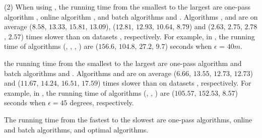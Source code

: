 \sstab (2) When using \sed, the running time from the smallest to the largest are one-pass algorithm \cised, online algorithm \squishe, and batch algorithms \tpa and \dpa.
Algorithms \tpa, \dpa and \squishe are on average
($8.58$, $13.33$, $15.81$, $13.09$), ($12.81$, $12.93$, $10.64$, $8.79$) and
($2.63$, $2.75$, $2.78$, $2.57$) times slower than \cised on datasets \dSets, respectively.
%
For example, in \mopsi, the running time of algorithms
(\tpa, \dpa, \squishe, \cised) are  ($156.6$, $104.8$, $27.2$, $9.7$) seconds when $\epsilon$ = $40m$.

 the running time from the smallest to the
largest are one-pass algorithm \interval and batch algorithms \tpa and \dpa.
%
Algorithms \tpa and \dpa are on average
($6.66$, $13.55$, $12.73$, $12.73$) and ($11.67$, $14.24$, $16.51$, $17.59$)
times slower than \interval on datasets \dSets, respectively.
%
For example, in \mopsi, the running time of algorithms
(\tpa, \dpa, \interval) are ($105.57$, $152.53$, $8.57$) seconds when
$\epsilon=45$ degrees, respectively.









The running time from the fastest to the slowest are one-pass algorithms, online and batch algorithms, and optimal algorithms.

